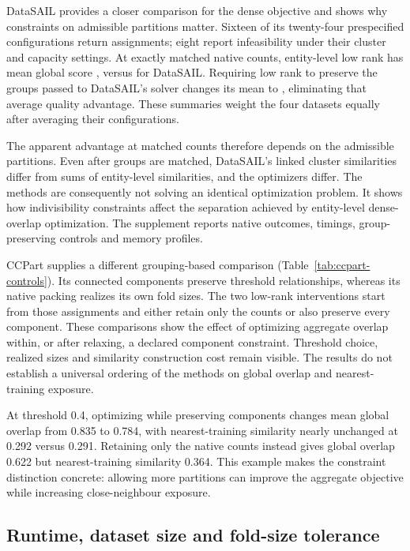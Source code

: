 DataSAIL provides a closer comparison for the dense objective and shows why
constraints on admissible partitions matter. Sixteen of its twenty-four
prespecified configurations return assignments; eight report infeasibility
under their cluster and capacity settings. At exactly matched native counts,
entity-level low rank has mean global score \CurrentMatchedGlobal{}, versus
\CurrentNativeGlobal{} for DataSAIL. Requiring low rank to preserve the groups
passed to DataSAIL's solver changes its mean to \CurrentMatchedGroupsGlobal{},
eliminating that average quality advantage. These summaries weight the four
datasets equally after averaging their configurations.

The apparent advantage at matched counts therefore depends on the admissible
partitions. Even after groups are matched, DataSAIL's linked cluster
similarities differ from sums of entity-level similarities, and the optimizers
differ. The methods are consequently not solving an identical optimization
problem. It shows how indivisibility constraints affect the separation achieved
by entity-level dense-overlap optimization. The supplement reports native
outcomes, timings, group-preserving controls and memory profiles.

CCPart supplies a different grouping-based comparison
(Table~\ref{tab:ccpart-controls}). Its connected components preserve threshold
relationships, whereas its native packing realizes its own fold sizes.
The two low-rank interventions start from those assignments and either retain
only the counts or also preserve every component. These comparisons show the
effect of optimizing aggregate overlap within, or after relaxing, a declared
component constraint. Threshold choice, realized sizes and similarity
construction cost remain visible. The results do not establish a universal
ordering of the methods on global overlap and nearest-training exposure.

At threshold 0.4, optimizing while preserving components changes mean global
overlap from 0.835 to 0.784, with nearest-training similarity nearly unchanged
at 0.292 versus 0.291. Retaining only the native counts instead gives global
overlap 0.622 but nearest-training similarity 0.364. This example makes the
constraint distinction concrete: allowing more partitions can improve the
aggregate objective while increasing close-neighbour exposure.



\subsection{Runtime, dataset size and fold-size tolerance}

